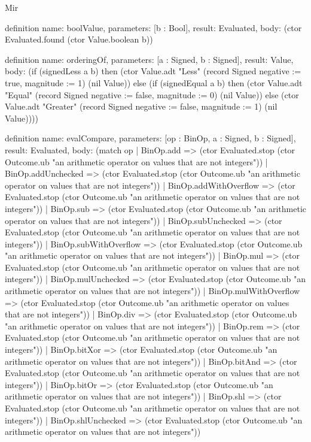 \begin{lexlean}{Mir}
\begin{semanticmodule}
definition{
  name: boolValue,
  parameters: [b : Bool],
  result: Evaluated,
  body: (ctor Evaluated.found (ctor Value.boolean b))
}

definition{
  name: orderingOf,
  parameters: [a : Signed, b : Signed],
  result: Value,
  body: (if (signedLess a b) then (ctor Value.adt "Less" (record Signed {negative := true, magnitude := 1}) (nil Value)) else (if (signedEqual a b) then (ctor Value.adt "Equal" (record Signed {negative := false, magnitude := 0}) (nil Value)) else (ctor Value.adt "Greater" (record Signed {negative := false, magnitude := 1}) (nil Value))))
}

definition{
  name: evalCompare,
  parameters: [op : BinOp, a : Signed, b : Signed],
  result: Evaluated,
  body: (match op
    | BinOp.add => (ctor Evaluated.stop (ctor Outcome.ub "an arithmetic operator on values that are not integers"))
    | BinOp.addUnchecked => (ctor Evaluated.stop (ctor Outcome.ub "an arithmetic operator on values that are not integers"))
    | BinOp.addWithOverflow => (ctor Evaluated.stop (ctor Outcome.ub "an arithmetic operator on values that are not integers"))
    | BinOp.sub => (ctor Evaluated.stop (ctor Outcome.ub "an arithmetic operator on values that are not integers"))
    | BinOp.subUnchecked => (ctor Evaluated.stop (ctor Outcome.ub "an arithmetic operator on values that are not integers"))
    | BinOp.subWithOverflow => (ctor Evaluated.stop (ctor Outcome.ub "an arithmetic operator on values that are not integers"))
    | BinOp.mul => (ctor Evaluated.stop (ctor Outcome.ub "an arithmetic operator on values that are not integers"))
    | BinOp.mulUnchecked => (ctor Evaluated.stop (ctor Outcome.ub "an arithmetic operator on values that are not integers"))
    | BinOp.mulWithOverflow => (ctor Evaluated.stop (ctor Outcome.ub "an arithmetic operator on values that are not integers"))
    | BinOp.div => (ctor Evaluated.stop (ctor Outcome.ub "an arithmetic operator on values that are not integers"))
    | BinOp.rem => (ctor Evaluated.stop (ctor Outcome.ub "an arithmetic operator on values that are not integers"))
    | BinOp.bitXor => (ctor Evaluated.stop (ctor Outcome.ub "an arithmetic operator on values that are not integers"))
    | BinOp.bitAnd => (ctor Evaluated.stop (ctor Outcome.ub "an arithmetic operator on values that are not integers"))
    | BinOp.bitOr => (ctor Evaluated.stop (ctor Outcome.ub "an arithmetic operator on values that are not integers"))
    | BinOp.shl => (ctor Evaluated.stop (ctor Outcome.ub "an arithmetic operator on values that are not integers"))
    | BinOp.shlUnchecked => (ctor Evaluated.stop (ctor Outcome.ub "an arithmetic operator on values that are not integers"))
}
\end{semanticmodule}
\end{lexlean}
